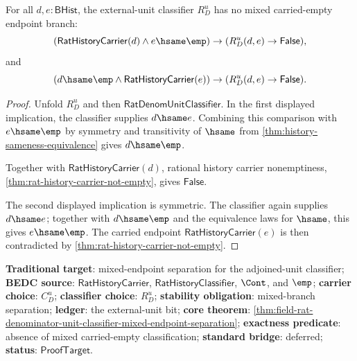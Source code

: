 \begin{theorem}
\label{thm:field-rat-denominator-unit-classifier-mixed-endpoint-separation}
For all $d,e:\mathsf{BHist}$, the external-unit classifier $R_D^u$ has no
mixed carried-empty endpoint branch:
$$
(\mathsf{RatHistoryCarrier}(d)\land e\hsame\emp)
\to (R_D^u(d,e)\to \mathsf{False}),
$$
and
$$
(d\hsame\emp\land \mathsf{RatHistoryCarrier}(e))
\to (R_D^u(d,e)\to \mathsf{False}).
$$
\end{theorem}
\begin{proof}
Unfold $R_D^u$ and then
$\mathsf{RatDenomUnitClassifier}$. In the first displayed implication, the
classifier supplies $d\hsame e$. Combining this comparison with $e\hsame\emp$
by symmetry and transitivity of $\hsame$ from
\autoref{thm:history-sameness-equivalence} gives $d\hsame\emp$.

Together with $\mathsf{RatHistoryCarrier}(d)$, rational history carrier
nonemptiness, \autoref{thm:rat-history-carrier-not-empty}, gives
$\mathsf{False}$.

The second displayed implication is symmetric. The classifier again supplies
$d\hsame e$; together with $d\hsame\emp$ and the equivalence laws for $\hsame$,
this gives $e\hsame\emp$. The carried endpoint
$\mathsf{RatHistoryCarrier}(e)$ is then contradicted by
\autoref{thm:rat-history-carrier-not-empty}.
\end{proof}

\textbf{Traditional target}: mixed-endpoint separation for the adjoined-unit classifier;
\textbf{BEDC source}: $\mathsf{RatHistoryCarrier}$,
$\mathsf{RatHistoryClassifier}$, $\Cont$, and $\emp$; \textbf{carrier choice}:
$C_D^u$; \textbf{classifier choice}: $R_D^u$; \textbf{stability
obligation}: mixed-branch separation; \textbf{ledger}: the external-unit bit;
\textbf{core theorem}:
\autoref{thm:field-rat-denominator-unit-classifier-mixed-endpoint-separation};
\textbf{exactness predicate}: absence of mixed carried-empty classification;
\textbf{standard bridge}: deferred; \textbf{status}: $\mathsf{ProofTarget}$.
